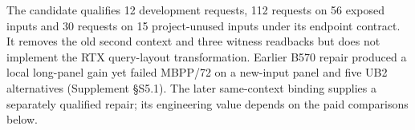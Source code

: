 The candidate qualifies 12 development requests, 112 requests on 56 exposed inputs and 30 requests on 15 project-unused inputs under its endpoint contract. It removes the old second context and three witness readbacks but does not implement the RTX query-layout transformation. Earlier B570 repair produced a local long-panel gain yet failed MBPP/72 on a new-input panel and five UB2 alternatives (Supplement \S S5.1). The later same-context binding supplies a separately qualified repair; its engineering value depends on the paid comparisons below.
